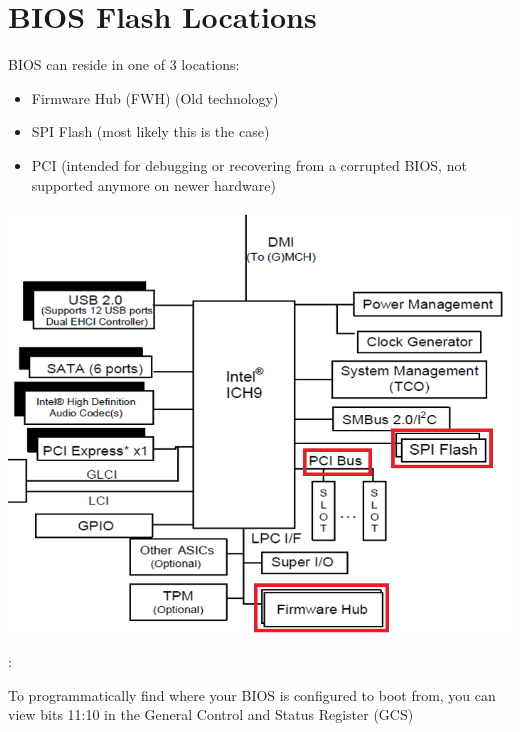 \section{BIOS Flash Locations}
\begin{note}
BIOS can reside in one of 3 locations:
\begin{itemize}
	\item Firmware Hub (FWH) (Old technology)
	\item SPI Flash (most likely this is the case)
	\item PCI (intended for debugging or recovering from a corrupted BIOS, not supported anymore on newer hardware)
\end{itemize}
\begin{center}
\includegraphics[scale=0.8]{Images/UEFI/BiosLocations}
\end{center}
\end{note}
\begin{note}:
	
To programmatically find where your BIOS is configured to boot from, you can view bits 11:10 in the General Control and Status Register (GCS)
\end{note}

